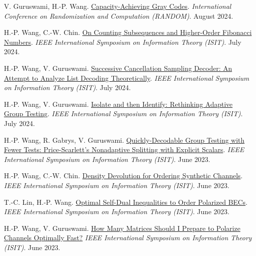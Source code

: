 \documentclass{article}
\def\sec#1{\vskip1em\textbf{\fs1#1}}
\def\fs#1{%
        \pgfmathsetmacro\a{#1}%
        \pgfmathsetmacro\A{\parskip*(4/3)^\a}%
        \pgfmathsetmacro\B{\A*(4/3)}%
        \fontsize{\A pt}{\B pt}\selectfont%
    }
\begin{document}
\bgroup
\def\section#1#2{\sec{Peer-Reviewed Conference Publications \mdseries (new to old)}}
\begin{thebibliography}{C99}
    V. Guruswami, H.-P. Wang.
    \href{https://doi.org/10.4230/LIPIcs.APPROX/RANDOM.2024.65}
    {Capacity-Achieving Gray Codes}.
    \emph{International Conference on Randomization and Computation (RANDOM)}.
    August 2024.

    H.-P. Wang, C.-W. Chin.
    \href{https://doi.org/10.1109/ISIT57864.2024.10619178}
    {On Counting Subsequences and Higher-Order Fibonacci Numbers}.
    \emph{IEEE International Symposium on Information Theory (ISIT)}.
    July 2024.
 
    H.-P. Wang, V. Guruswami.
    \href{https://doi.org/10.1109/ISIT57864.2024.10619251}
    {Successive Cancellation Sampling Decoder: An Attempt to Analyze List Decoding Theoretically}.
    \emph{IEEE International Symposium on Information Theory (ISIT)}.
    July 2024.
 
    H.-P. Wang, V. Guruswami.
    \href{https://doi.org/10.1109/ISIT57864.2024.10619098}
    {Isolate and then Identify: Rethinking Adaptive Group Testing}.
    \emph{IEEE International Symposium on Information Theory (ISIT)}.
    July 2024.

    H.-P. Wang, R. Gabrys, V. Guruswami.
    \href{https://doi.org/10.1109/ISIT54713.2023.10206843}
    {Quickly-Decodable Group Testing with Fewer Tests: Price-Scarlett's Nonadaptive Splitting with Explicit Scalars}.
    \emph{IEEE International Symposium on Information Theory (ISIT)}.
    June 2023.

    H.-P. Wang, C.-W. Chin.
    \href{https://doi.org/10.1109/ISIT54713.2023.10206540}
    {Density Devolution for Ordering Synthetic Channels}.
    \emph{IEEE International Symposium on Information Theory (ISIT)}.
    June 2023.

    T.-C. Lin, H.-P. Wang.
    \href{https://doi.org/10.1109/ISIT54713.2023.10206451}
    {Optimal Self-Dual Inequalities to Order Polarized BECs}.
    \emph{IEEE International Symposium on Information Theory (ISIT)}.
    June 2023.

    H.-P. Wang, V. Guruswami.
    \href{https://doi.org/10.1109/ISIT54713.2023.10206989}
    {How Many Matrices Should I Prepare to Polarize Channels Optimally Fast?}
    \emph{IEEE International Symposium on Information Theory (ISIT)}.
    June 2023.


\end{thebibliography}
\end{document}
